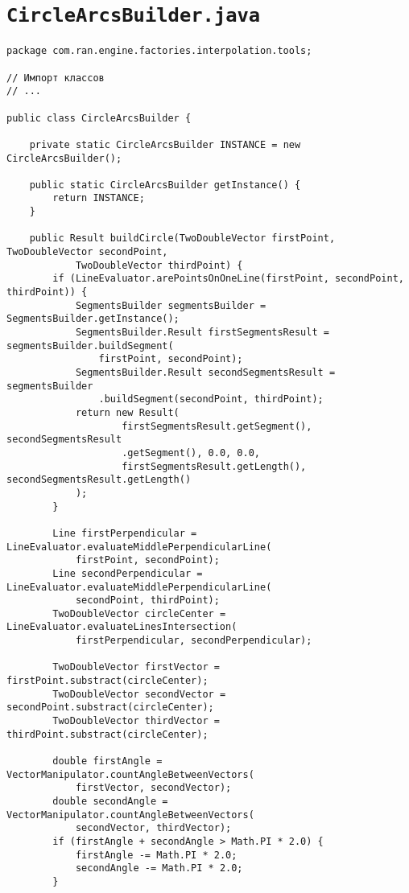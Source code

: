 \section*{\texttt{CircleArcsBuilder.java}}
\begin{verbatim}
package com.ran.engine.factories.interpolation.tools;

// Импорт классов
// ...

public class CircleArcsBuilder {

    private static CircleArcsBuilder INSTANCE = new CircleArcsBuilder();

    public static CircleArcsBuilder getInstance() {
        return INSTANCE;
    }

    public Result buildCircle(TwoDoubleVector firstPoint, TwoDoubleVector secondPoint,
            TwoDoubleVector thirdPoint) {
        if (LineEvaluator.arePointsOnOneLine(firstPoint, secondPoint, thirdPoint)) {
            SegmentsBuilder segmentsBuilder = SegmentsBuilder.getInstance();
            SegmentsBuilder.Result firstSegmentsResult = segmentsBuilder.buildSegment(
                firstPoint, secondPoint);
            SegmentsBuilder.Result secondSegmentsResult = segmentsBuilder
                .buildSegment(secondPoint, thirdPoint);
            return new Result(
                    firstSegmentsResult.getSegment(), secondSegmentsResult
                    .getSegment(), 0.0, 0.0,
                    firstSegmentsResult.getLength(), secondSegmentsResult.getLength()
            );
        }

        Line firstPerpendicular = LineEvaluator.evaluateMiddlePerpendicularLine(
            firstPoint, secondPoint);
        Line secondPerpendicular = LineEvaluator.evaluateMiddlePerpendicularLine(
            secondPoint, thirdPoint);
        TwoDoubleVector circleCenter = LineEvaluator.evaluateLinesIntersection(
            firstPerpendicular, secondPerpendicular);

        TwoDoubleVector firstVector = firstPoint.substract(circleCenter);
        TwoDoubleVector secondVector = secondPoint.substract(circleCenter);
        TwoDoubleVector thirdVector = thirdPoint.substract(circleCenter);

        double firstAngle = VectorManipulator.countAngleBetweenVectors(
            firstVector, secondVector);
        double secondAngle = VectorManipulator.countAngleBetweenVectors(
            secondVector, thirdVector);
        if (firstAngle + secondAngle > Math.PI * 2.0) {
            firstAngle -= Math.PI * 2.0;
            secondAngle -= Math.PI * 2.0;
        }


\end{verbatim}
